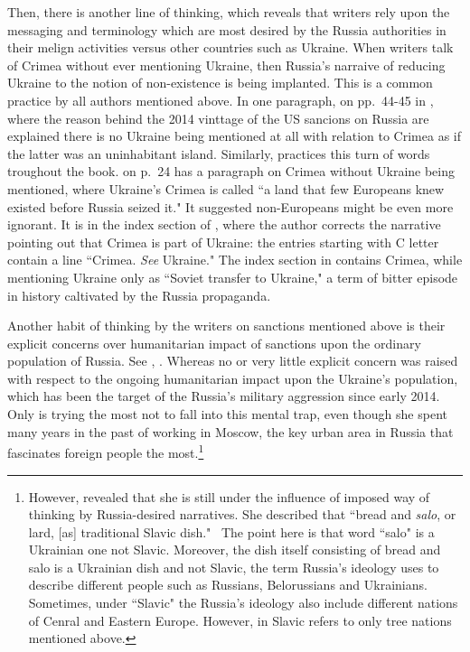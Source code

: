Then, there is another line of thinking, which reveals that writers rely upon the messaging and terminology which are most desired by the Russia authorities in their melign activities versus other countries such as Ukraine. When writers talk of Crimea without ever mentioning Ukraine, then Russia's narraive of reducing Ukraine to the notion of non-existence is being implanted. This is a common practice by all authors mentioned above. In one paragraph, on pp.~44-45 in \cite{mcdowell}, where the reason behind the 2014 vinttage of the US sancions on Russia are explained there is no Ukraine being mentioned at all with relation to Crimea as if the latter was an uninhabitant island. Similarly, \cite{demarais2022,baker2024} practices this turn of words troughout the book. \cite{demarais2022} on p.~24 has a paragraph on Crimea without Ukraine being mentioned, where Ukraine's Crimea is called ``a land that few Europeans knew existed before Russia seized it." It suggested non-Europeans might be even more ignorant. It is in the index section of \cite{demarais2022}, where the author corrects the narrative pointing out that Crimea is part of Ukraine: the entries starting with C letter contain a line ``Crimea. \textit{See} Ukraine." The index section in \cite{baker2024} contains Crimea, while mentioning Ukraine only as ``Soviet transfer to Ukraine," a term of bitter episode in history caltivated by the Russia propaganda. 

Another habit of thinking by the writers on sanctions mentioned above is their explicit concerns over humanitarian impact of sanctions upon the ordinary population of Russia. See \citep[p.~54]{demarais2022}, \citep[p.~xiii]{mohsin2024}. Whereas no or very little explicit concern was raised with respect to the ongoing humanitarian impact upon the Ukraine's population, which has been the target of the Russia's military aggression since early 2014. Only \cite{baker2024} is trying the most not to fall into this mental trap, even though she spent many years in the past of working in Moscow, the key urban area in Russia that fascinates foreign people the most.\footnote{However, \cite{baker2024} revealed that she is still under the influence of imposed way of thinking by Russia-desired narratives. She described that ``bread and \textit{salo}, or lard, [as] traditional Slavic dish."~\citep[p.~66]{baker2024} The point here is that word ``salo" is a Ukrainian one not Slavic. Moreover, the dish itself consisting of bread and salo is a Ukrainian dish and not Slavic, the term Russia's ideology uses to describe different people such as Russians, Belorussians and Ukrainians. Sometimes, under ``Slavic" the Russia's ideology also include different nations of Cenral and Eastern Europe. However, in \cite{baker2024} Slavic refers to only tree nations mentioned above.}

